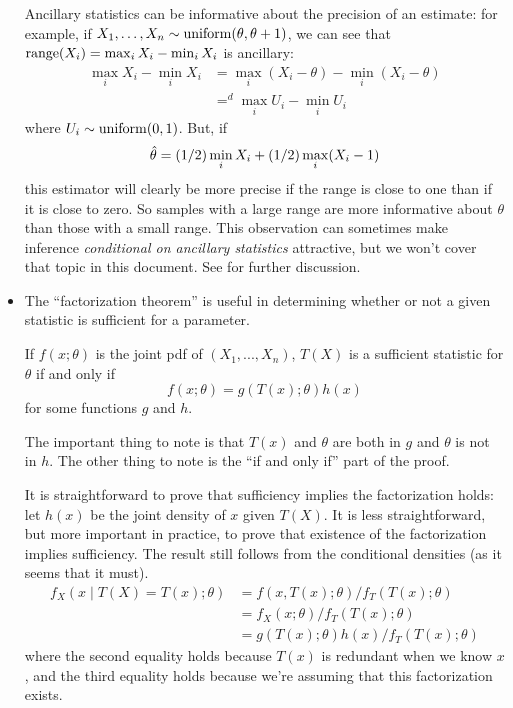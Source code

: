 \begin{itemize}[leftmargin=0pt]
  Ancillary statistics can be informative about the precision of an
  estimate: for example, if $X_1,\ldots,X_n \sim \operatorname{uniform}(\theta,\theta+1)$, we can
  see that $\operatorname{range}(X_i) = \max_i X_i - \min_i X_i$ is ancillary:
  \begin{align*}
    \max_i X_i - \min_i X_i
    &= \max_i (X_i - \theta) - \min_i (X_i - \theta) \\
    &=^d \max_i U_i - \min_i U_i
  \end{align*}
  where $U_i \sim \operatorname{uniform}(0, 1)$.  But, if
  \begin{equation*}
    \hat{\theta} = (1/2) \min_i X_i + (1/2) \max_i (X_i - 1)
  \end{equation*}
  this estimator will clearly be more precise if the range is close to
  one than if it is close to zero.  So samples with a large range are
  more informative about $\theta$ than those with a small range.  This
  observation can sometimes make inference \emph{conditional on
  ancillary statistics} attractive, but we won't cover that topic in
  this document.  See \citet[Chapter 10]{LR:05} for further discussion.

\item The ``factorization theorem'' is useful in determining whether
  or not a given statistic is sufficient for a parameter.
  \begin{thm}
    If $f(x; \theta)$ is the joint pdf of $(X_1,...,X_n)$, $T(X)$ is a
    sufficient statistic for $\theta$ if and only if
    \begin{equation*}
      f(x; \theta) = g(T(x); \theta) h(x)
    \end{equation*}
    for some functions $g$ and $h$.
  \end{thm}
  The important thing to note is that $T(x)$ and $\theta$ are both in $g$
  and $\theta$ is not in $h$.  The other thing to note is the ``if and only
  if'' part of the proof.

  It is straightforward to prove that sufficiency implies the
  factorization holds: let $h(x)$ be the joint density of $x$ given
  $T(X)$.  It is less straightforward, but more important in practice,
  to prove that existence of the factorization implies sufficiency.
  The result still follows from the conditional densities (as it seems
  that it must).
  \begin{align*}
    f_X(x \mid T(X) = T(x); \theta)
    &= f(x, T(x); \theta) / f_T(T(x); \theta) \\
    &= f_X(x; \theta) / f_T(T(x); \theta) \\
    &= g(T(x); \theta) h(x) / f_T(T(x); \theta)
  \end{align*}
  where the second equality holds because $T(x)$ is redundant when we
  know $x$, and the third equality holds because we're assuming that
  this factorization exists.


\end{itemize}
